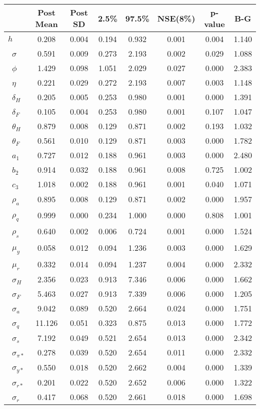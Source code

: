 \begin{tiny}\begin{tabular}{lccccccc}
\hline
&\textbf{Post Mean}&\textbf{Post SD}&\textbf{2.5\%}&\textbf{97.5\%}&\textbf{NSE(8\%)}&\textbf{p-value}&\textbf{B-G}\\\hline
\textbf{$ h             $}&0.208&0.004&0.194&0.932&0.001&0.004&1.140\\\
\textbf{$ \sigma        $}&0.591&0.009&0.273&2.193&0.002&0.029&1.088\\\
\textbf{$ \phi          $}&1.429&0.098&1.051&2.029&0.027&0.000&2.383\\\
\textbf{$ \eta          $}&0.221&0.029&0.272&2.193&0.007&0.003&1.148\\\
\textbf{$ \delta_{H}    $}&0.205&0.005&0.253&0.980&0.001&0.000&1.391\\\
\textbf{$ \delta_{F}    $}&0.105&0.004&0.253&0.980&0.001&0.107&1.047\\\
\textbf{$ \theta_{H}    $}&0.879&0.008&0.129&0.871&0.002&0.193&1.032\\\
\textbf{$ \theta_{F}    $}&0.561&0.010&0.129&0.871&0.003&0.000&1.782\\\
\textbf{$ a_{1}         $}&0.727&0.012&0.188&0.961&0.003&0.000&2.480\\\
\textbf{$ b_{2}         $}&0.914&0.032&0.188&0.961&0.008&0.725&1.002\\\
\textbf{$ c_{3}         $}&1.018&0.002&0.188&0.961&0.001&0.040&1.071\\\
\textbf{$ \rho_{a}      $}&0.895&0.008&0.129&0.871&0.002&0.000&1.957\\\
\textbf{$ \rho_{q}      $}&0.999&0.000&0.234&1.000&0.000&0.808&1.001\\\
\textbf{$ \rho_{s}      $}&0.640&0.002&0.006&0.724&0.001&0.000&1.524\\\
\textbf{$ \mu_{y}       $}&0.058&0.012&0.094&1.236&0.003&0.000&1.629\\\
\textbf{$ \mu_{r}       $}&0.332&0.014&0.094&1.237&0.004&0.000&2.332\\\
\textbf{$ \sigma_{H}    $}&2.356&0.023&0.913&7.346&0.006&0.000&1.662\\\
\textbf{$ \sigma_{F}    $}&5.463&0.027&0.913&7.339&0.006&0.000&1.205\\\
\textbf{$ \sigma_{a}    $}&9.042&0.089&0.520&2.664&0.024&0.000&1.751\\\
\textbf{$ \sigma_{q}    $}&11.126&0.051&0.323&0.875&0.013&0.000&1.772\\\
\textbf{$ \sigma_{s}    $}&7.192&0.049&0.521&2.654&0.013&0.000&2.342\\\
\textbf{$ \sigma_{\pi*} $}&0.278&0.039&0.520&2.654&0.011&0.000&2.332\\\
\textbf{$ \sigma_{y*}   $}&0.550&0.018&0.520&2.662&0.004&0.000&1.339\\\
\textbf{$ \sigma_{r*}   $}&0.201&0.022&0.520&2.652&0.006&0.000&1.322\\\
\textbf{$ \sigma_{r}    $}&0.417&0.068&0.520&2.661&0.018&0.000&1.698\\\hline
\end{tabular}
\end{tiny}